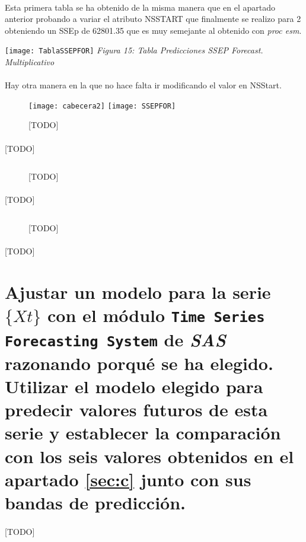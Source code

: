 \documentclass[a4paper, spanish]{article}
\begin{document}
    \paragraph{}
    Esta primera tabla se ha obtenido de la misma manera que en el apartado anterior probando a variar  el  atributo NSSTART que finalmente se realizo para 2 obteniendo un SSEp de 62801.35 que es muy semejante al obtenido con \textit{proc esm}.

    \begin{center}
      \texttt{[image: TablaSSEPFOR]}
    \textit{Figura 15: Tabla Predicciones SSEP Forecast. Multiplicativo}
    \end{center}

    \paragraph{}
    Hay otra manera en la que no hace falta ir modificando el valor en NSStart.

    \begin{figure}
      \texttt{[image: cabecera2]}
      \texttt{[image: SSEPFOR]}
      \caption{[TODO]}
      \label{}
    \end{figure}

    \paragraph{}
    [TODO]

    \begin{figure}[h!]
      \centering
      \inputminted{SAS}{./res/code/e.sas}
      \caption{[TODO]}
      \label{}
    \end{figure}

    \paragraph{}
    [TODO]

    \begin{figure}[h!]
      \centering
      \inputminted{SAS}{./res/code/e-prediction-error-forecast.sas}
      \caption{[TODO]}
      \label{code:e_prediction_error_forecast}
    \end{figure}

    \paragraph{}
    [TODO]


  \section{Ajustar un modelo para la serie $\{ Xt \}$ con el módulo \texttt{Time Series Forecasting System} de \emph{SAS} razonando porqué se ha elegido. Utilizar el modelo elegido para predecir valores futuros de esta serie y establecer la comparación con los seis valores obtenidos en el apartado \ref{sec:c} junto con sus bandas de predicción.}
  \label{sec:f}

    \paragraph{}
    [TODO]
\end{document}
